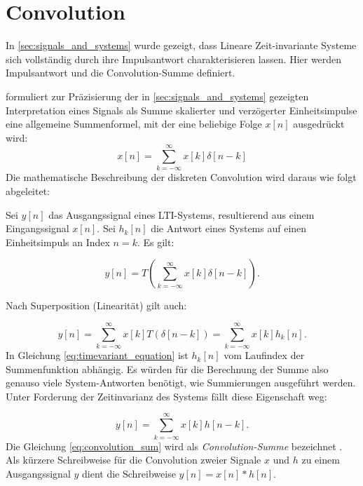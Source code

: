 \section{Convolution} 
\label{sec:convolution}
In \ref{sec:signals_and_systems} wurde gezeigt, dass Lineare Zeit-invariante Systeme sich vollständig durch ihre Impulsantwort
charakterisieren lassen. Hier werden Impulsantwort und die Convolution-Summe definiert.

\cite[Seite 11]{oppenheim1999} formuliert zur Präzisierung der in \ref{sec:signals_and_systems} gezeigten Interpretation eines Signals als Summe skalierter und verzögerter Einheitsimpulse eine allgemeine Summenformel, mit der eine beliebige Folge $x[n]$ ausgedrückt wird:
\begin{equation}
    x[n]=\sum_{k=-\infty}^\infty x[k]\delta[n-k]
    \label{eq:scaled_unit_sum}
\end{equation}
Die mathematische Beschreibung der diskreten Convolution wird daraus wie folgt abgeleitet: 

Sei $y[n]$ das Ausgangssignal eines LTI-Systems, resultierend aus einem Eingangssignal $x[n]$. Sei $h_k[n]$ die Antwort eines Systems
auf einen Einheitsimpuls an Index $n=k$. Es gilt:

\begin{equation}
    y[n]=T\left( \sum_{k=-\infty}^{\infty}x[k]\delta[n-k] \right).
\end{equation}

Nach Superposition (Linearität) gilt auch:

\begin{equation}
    y[n]=\sum_{k=-\infty}^{\infty}x[k]T(\delta[n-k])=\sum_{k=-\infty}^{\infty}x[k]h_k[n].
    \label{eq:timevariant_equation}
\end{equation}
In Gleichung \ref{eq:timevariant_equation} ist $h_k[n]$ vom Laufindex der Summenfunktion abhängig. Es würden für die Berechnung der Summe also
genauso viele System-Antworten benötigt, wie Summierungen ausgeführt werden.
Unter Forderung der Zeitinvarianz des Systems fällt diese Eigenschaft weg:

\begin{equation}
    y[n]=\sum_{k=-\infty}^{\infty}x[k]h[n-k].
    \label{eq:convolution_sum}
\end{equation}
Die Gleichung \ref{eq:convolution_sum} wird als \textit{Convolution-Summe} bezeichnet \cite[Seite 22f]{oppenheim1999}. Als kürzere Schreibweise für 
die Convolution zweier Signale $x$ und $h$ zu einem Ausgangssignal $y$ dient die Schreibweise $y[n]=x[n]*h[n]$.

